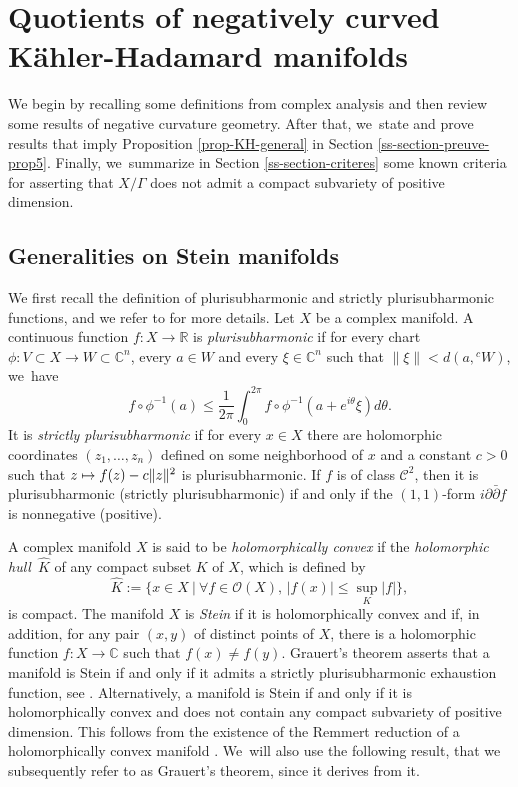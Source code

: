 \documentclass[JEP,XML,SOM,Unicode,NoEqCountersInSection,published]{cedram}
\let\ts\textstyle
\newcommand\mto{\mathchoice{\longmapsto}{\mapsto}{\mapsto}{\mapsto}}
\theoremstyle{definition}
\newcommand{\C}{\mathbb{C}}
\newcommand{\R}{\mathbb{R}}
\def\C{\mathbb{C}}
\begin{document}
\section{Quotients of negatively curved Kähler-Hadamard manifolds}\label{section-kahler-hadamard}

We begin by recalling some definitions from complex analysis and then review some results of negative curvature geometry. After that, we~state and prove results that imply Proposition \ref{prop-KH-general} in Section \ref{ss-section-preuve-prop5}. Finally, we~summarize in Section \ref{ss-section-criteres} some known criteria for asserting that $X/\Gamma$ does not admit a compact subvariety of positive dimension.

\subsection{Generalities on Stein manifolds}\label{ss-section-stein}

We first recall the definition of plurisubharmonic and strictly plurisubharmonic functions, and we refer to \cite[Ch.\,1]{demaillyComplexAnalyticDifferential-manuel} for more details. Let $X$ be a complex manifold. A continuous function $f:X\to \R$ is \textit{plurisubharmonic} if for every chart $\phi:V\subset X\to W\subset \C^{n}$, every $a\in W$ and every $\xi\in \C^{n}$ such that $\lVert \xi\rVert < d(a,{}^{c}W)$, we~have
\begin{equation*}
f\circ\phi^{-1}(a) \le \frac{1}{2\pi}\int_{0}^{2\pi}f\circ\phi^{-1}(a+e^{i\theta}\xi)d\theta.
\end{equation*}
It is \textit{strictly plurisubharmonic} if for every $x\in X$ there are holomorphic coordinates $(z_1,\dots,z_n)$ defined on some neighborhood of $x$ and a constant $c>0$ such that $z\mto f(z)-c\lVert z\rVert^{2}$ is plurisubharmonic. If $f$ is of class $\mathcal{C}^2$, then it is plurisubharmonic (\resp strictly plurisubharmonic) if and only if the $(1,1)$-form $i\partial\bar\partial f$ is nonnegative (\resp positive).

A complex manifold $X$ is said to be \textit{holomorphically convex} if the \textit{holomorphic hull}~$\widehat{K}$ of any compact subset $K$ of $X$, which is defined by
\begin{equation*}
\widehat{K}:= \ts\{x\in X \ \vert\ \forall f\in \mathcal{O}(X),\, \lvert f(x)\rvert \le \sup_{K}\lvert f\rvert\},
\end{equation*}
is compact. The manifold $X$ is \textit{Stein} if it is holomorphically convex and if, in addition, for any pair $(x,y)$ of distinct points of $X$, there is a holomorphic function $f:X\to \C$ such that $f(x)\ne f(y)$. Grauert's theorem asserts that a manifold is Stein if and only if it admits a strictly plurisubharmonic exhaustion function, see \cite{grauertLeviProblemImbedding1958}. Alternatively, a manifold is Stein if and only if it is holomorphically convex and does not contain any compact subvariety of positive dimension. This follows from the existence of the Remmert reduction of a holomorphically convex manifold \cite[Th.\,2.1]{peternellPseudoconvexityLeviProblem1994}. We~will also use the following result, that we subsequently refer to as Grauert's theorem, since it derives from it.
\end{document}
